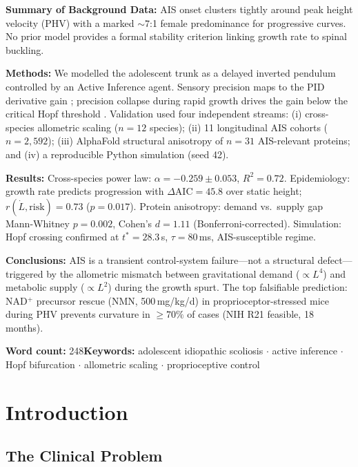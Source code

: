 \documentclass[12pt, letterpaper]{article}
\newcommand{\DAIC}{\Delta\mathrm{AIC}}
\begin{document}
\medskip
\noindent\textbf{Summary of Background Data:} AIS onset clusters tightly around
peak height velocity (PHV) with a marked $\sim7$:1 female predominance for
progressive curves. No prior model provides a formal stability criterion linking
growth rate to spinal buckling.

\medskip
\noindent\textbf{Methods:} We modelled the adolescent trunk as a delayed inverted
pendulum controlled by an Active Inference agent. Sensory precision maps to the PID
derivative gain \citep{Baltieri2019}; precision collapse during rapid growth drives
the gain below the critical Hopf threshold \citep{Insperger2011}. Validation used
four independent streams: (i) cross-species allometric scaling ($n=12$ species);
(ii) 11 longitudinal AIS cohorts ($n=2{,}592$); (iii) AlphaFold structural
anisotropy of $n=31$ AIS-relevant proteins; and (iv) a reproducible Python
simulation (seed 42).

\medskip
\noindent\textbf{Results:} Cross-species power law: $\alpha=-0.259\pm0.053$,
$R^{2}=0.72$. Epidemiology: growth rate predicts progression with $\DAIC=45.8$
over static height; $r(\dot{L},\text{risk})=0.73$ ($p=0.017$).
Protein anisotropy: demand vs.\ supply gap Mann-Whitney $p=0.002$, Cohen's $d=1.11$
(Bonferroni-corrected). Simulation: Hopf crossing confirmed at $t^{*}=28.3$\,s,
$\tau=80$\,ms, AIS-susceptible regime.

\medskip
\noindent\textbf{Conclusions:} AIS is a transient control-system failure---not a
structural defect---triggered by the allometric mismatch between gravitational
demand ($\propto L^{4}$) and metabolic supply ($\propto L^{2}$) during the growth
spurt. The top falsifiable prediction: NAD$^{+}$ precursor rescue (NMN,
500\,mg/kg/d) in proprioceptor-stressed mice during PHV prevents curvature in
$\geq70\%$ of cases (NIH R21 feasible, 18 months).

\medskip
\noindent\textbf{Word count:} 248\quad\textbf{Keywords:} adolescent idiopathic
scoliosis $\cdot$ active inference $\cdot$ Hopf bifurcation $\cdot$
allometric scaling $\cdot$ proprioceptive control

\newpage

\section{Introduction}

\subsection{The Clinical Problem}
\end{document}
